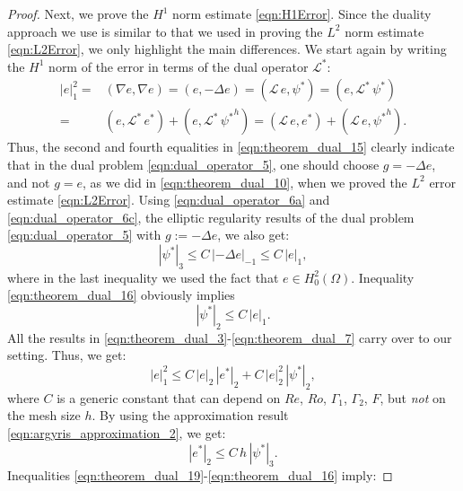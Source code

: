 \begin{proof}
  Next, we prove the $H^1$ norm estimate \eqref{eqn:H1Error}.  Since the duality
  approach we use is similar to that we used in proving the  $L^2$ norm estimate
  \eqref{eqn:L2Error}, we only highlight the main differences.  We start again
  by writing the $H^1$ norm of the error in terms of the dual operator
  $\mathcal{L}^*$:
  \begin{align}
    |e|_1^2 =& (\nabla e , \nabla e) = ( e , - \Delta e) =
      (\mathcal{L} \, e , \psi^*) = (e , \mathcal{L}^* \, \psi^*) \nonumber \\
    =& (e , \mathcal{L}^* \, e^*) + (e , \mathcal{L}^* \, {\psi^*}^h)
      = (\mathcal{L} \, e , e^*) + (\mathcal{L} \, e , {\psi^*}^h) .
    \label{eqn:theorem_dual_15}
  \end{align}
  Thus, the second and fourth equalities in \eqref{eqn:theorem_dual_15} clearly
  indicate that in the dual problem \eqref{eqn:dual_operator_5}, one should
  choose $g = - \Delta e$, and not $g = e$, as we did in
  \eqref{eqn:theorem_dual_10}, when we proved the $L^2$ error estimate
  \eqref{eqn:L2Error}.  Using \eqref{eqn:dual_operator_6a} and
  \eqref{eqn:dual_operator_6c}, the elliptic regularity results of the dual
  problem \eqref{eqn:dual_operator_5} with $g :=  - \Delta e$, we also get:
  \begin{equation}
    | \psi^* |_3 \leq C \, | - \Delta e |_{-1} \leq C \, | e |_1 ,
    \label{eqn:theorem_dual_16}
  \end{equation}
  where in the last inequality we used the fact that $e \in H_0^2(\Omega)$.
  Inequality \eqref{eqn:theorem_dual_16} obviously implies
  \begin{equation}
    | \psi^* |_2 \leq C \, | e |_1 .
    \label{eqn:theorem_dual_17}
  \end{equation}
  All the results in \eqref{eqn:theorem_dual_3}-\eqref{eqn:theorem_dual_7} carry
  over to our setting.  Thus, we get:
  \begin{equation}
    |e|_1^2 \leq C \, | e |_2 \, |e^* |_2 + C \, | e |_2^2 \, | \psi^* |_2 ,
    \label{eqn:theorem_dual_18}
  \end{equation}
  where $C$ is a generic constant that can depend on $Re$, $Ro$, $\Gamma_1$,
  $\Gamma_2$,  $F$, but \emph{not} on the mesh size $h$.  By using the
  approximation result \eqref{eqn:argyris_approximation_2}, we get:
  \begin{equation}
    |e^* |_2 \leq C \, h \, | \psi^* |_3 .
    \label{eqn:theorem_dual_19}
  \end{equation}
  Inequalities \eqref{eqn:theorem_dual_19}-\eqref{eqn:theorem_dual_16} imply:

\end{proof}
